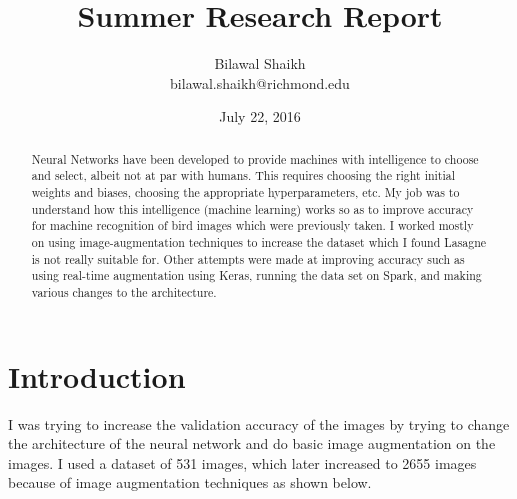 \documentclass[11pt,twocolumn]{article}
\title{Summer Research Report}
\author{
  Bilawal Shaikh\\
  bilawal.shaikh@richmond.edu
}
\date{July 22, 2016}
\begin{document}
\maketitle
\begin{abstract}
  Neural Networks have been developed to provide machines with intelligence to choose and select, albeit not at par with humans. This requires choosing the right initial weights and biases, choosing the appropriate hyperparameters, etc. My job was to understand how this intelligence (machine learning) works so as to improve accuracy for machine recognition of bird images which were previously taken. I worked mostly on using image-augmentation techniques to increase the dataset which I found Lasagne is not really suitable for. Other attempts were made at improving accuracy such as using real-time augmentation using Keras, running the data set on Spark, and making various changes to the architecture.
  
\end{abstract}


\section{Introduction}

I was trying to increase the validation accuracy of the images by trying to change the architecture of the neural network and do basic image augmentation on the images. I used a dataset of 531 images, which later increased to 2655 images because of image augmentation techniques as shown below.
\end{document}
